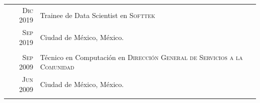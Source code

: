 \documentclass[a4paper,10pt]{article} %
\begin{document}
\begin{tabular}{r|p{13cm}}
	
	
	\textsc{Dic 2019}& Trainee de Data Scientist en \textsc{Softtek}\\
	\textsc{Sep 2019}& \small Ciudad de México, México.\\
	\multicolumn{2}{c}{} \\
	
	
	\textsc{Sep 2009}& Técnico en Computación en \textsc{Dirección General de Servicios a la Comunidad}\\
	\textsc{Jun 2009}& \small Ciudad de México, México.\\
	\multicolumn{2}{c}{} \\
	
	
\end{tabular}
\end{document}
